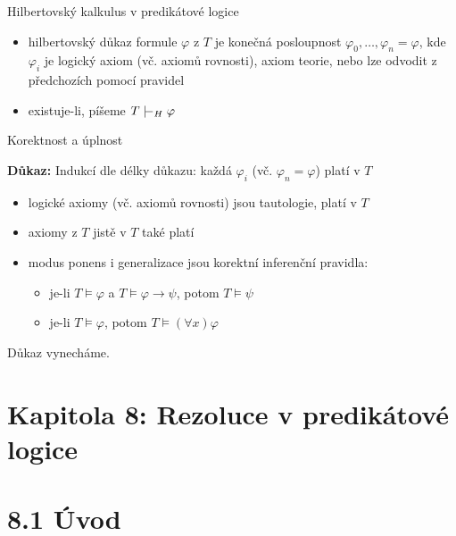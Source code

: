 \documentclass{beamer}
\begin{document}
\begin{frame}{Hilbertovský kalkulus v predikátové logice}
\begin{itemize}
        \item \alert{hilbertovský důkaz} formule $\varphi$ z $T$ je \alert{konečná} posloupnost $\varphi_0, \dots, \varphi_n=\varphi$, kde $\varphi_i$ je \alert{logický axiom} (vč. axiomů rovnosti), \alert{axiom teorie}, nebo lze odvodit z předchozích pomocí pravidel
        \item existuje-li, píšeme \alert{$T\proves_H\varphi$}
    \end{itemize}

\end{frame}


\begin{frame}{Korektnost a úplnost}


    \medskip

    \textbf{Důkaz:} Indukcí dle délky důkazu: každá $\varphi_i$ (vč. $\varphi_n=\varphi$) platí v $T$
    \begin{itemize}
        \item logické axiomy (vč. axiomů rovnosti) jsou tautologie, platí v $T$
        \item axiomy z $T$ jistě v $T$ také platí
         \item modus ponens i generalizace jsou \alert{korektní} inferenční pravidla:
        \begin{itemize}
            \item je-li $T\models\varphi$ a $T\models\varphi\to\psi$, potom $T\models\psi$
            \item je-li $T\models\varphi$, potom $T\models(\forall x)\varphi$
            \hfill\qedsymbol
        \end{itemize}
    \end{itemize}

    \bigskip
    

    Důkaz vynecháme.
    
\end{frame}


\section{\sc Kapitola 8: Rezoluce v predikátové logice}


\section{8.1 Úvod}
\end{document}
